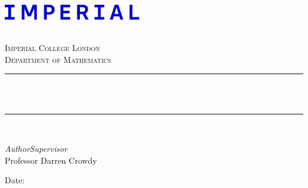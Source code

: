 \begin{titlepage}

    \newcommand{\HRule}{\rule{\linewidth}{0.5mm}} %
    
    
    \includegraphics[width = 6cm]{./figures/imperial_new}\\[2cm] 
    
    \begin{center} %
    
    \textsc{\LARGE \reporttype}\\[1.5cm] 
    \textsc{\Large Imperial College London}\\[0.5cm] 
    \textsc{\large Department of Mathematics}\\[0.5cm] 
    
    \HRule \\[0.4cm]
    { \huge \bfseries \reporttitle}\\ %
    \HRule \\[1.5cm]
    \end{center}
    
    \begin{flushleft} \large
    \textit{Author}\hfill\textit{Supervisor}\\
    \reportauthor \hfill Professor Darren Crowdy
    \end{flushleft}
    
    \ifdefined\reportabstract
    {\vspace{2cm}
    \begin{abstract}
    \reportabstract
    \end{abstract}
    \vfill}
    \fi
    {\vfill}
    
    \vspace{2cm}
    \makeatletter
    Date: \@date 
    \makeatother
        
    
\end{titlepage}

\setcounter{page}{1}